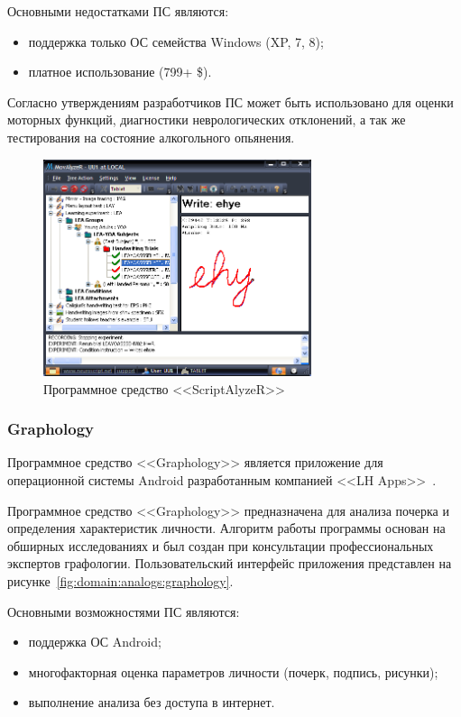 Основными недостатками ПС являются:
\begin{itemize}
  \item поддержка только ОС семейства Windows (XP, 7, 8);
  \item платное использование (799+ \$).
\end{itemize}

Согласно утверждениям разработчиков ПС может быть использовано для оценки моторных функций, диагностики неврологических отклонений, а так же тестирования на состояние алкогольного опьянения.

\begin{figure}[ht]
    \centering
    \includegraphics[width=0.7\textwidth]{figures/neuroscript.png}
    \caption{Программное средство <<ScriptAlyzeR>>}
    \label{fig:domain:analogs:neuro_script}
\end{figure}

\subsubsection{Graphology}
\label{sub:domain:analogs:graphology} 

Программное средство <<Graphology>> является приложение для операционной системы Android разработанным компанией <<LH Apps>>~\cite{analogs_graphology}.

Программное средство <<Graphology>> предназначена для анализа почерка и определения характеристик личности. Алгоритм работы программы основан на обширных исследованиях и был создан при консультации профессиональных экспертов графологии. Пользовательский интерфейс приложения представлен на рисунке~\ref{fig:domain:analogs:graphology}.

Основными возможностями ПС являются:
\begin{itemize}
  \item поддержка ОС Android;
  \item многофакторная оценка параметров личности (почерк, подпись, рисунки);
  \item выполнение анализа без доступа в интернет.
\end{itemize}

